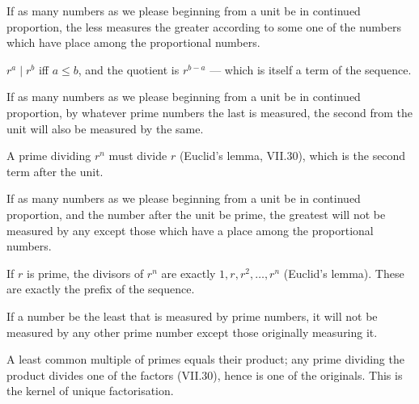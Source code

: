 \documentclass{rrxiv}
\begin{document}
\begin{claim}
\label{prop:IX.11}
If as many numbers as we please beginning from a unit be in continued
proportion, the less measures the greater according to some one of
the numbers which have place among the proportional numbers.
\end{claim}
\begin{evidence}[Proof of IX.11]
\label{ev:IX.11}
$r^a \mid r^b$ iff $a \le b$, and the quotient is $r^{b-a}$ --- which
is itself a term of the sequence.
\end{evidence}

\begin{claim}
\label{prop:IX.12}
If as many numbers as we please beginning from a unit be in continued
proportion, by whatever prime numbers the last is measured, the
second from the unit will also be measured by the same.
\end{claim}
\begin{evidence}[Proof of IX.12]
\label{ev:IX.12}
A prime dividing $r^n$ must divide $r$ (Euclid's lemma, VII.30),
which is the second term after the unit.
\end{evidence}

\begin{claim}
\label{prop:IX.13}
If as many numbers as we please beginning from a unit be in continued
proportion, and the number after the unit be prime, the greatest will
not be measured by any except those which have a place among the
proportional numbers.
\end{claim}
\begin{evidence}[Proof of IX.13]
\label{ev:IX.13}
If $r$ is prime, the divisors of $r^n$ are exactly $1, r, r^2, \dots,
r^n$ (Euclid's lemma).  These are exactly the prefix of the sequence.
\end{evidence}

\begin{claim}
\label{prop:IX.14}
If a number be the least that is measured by prime numbers, it will
not be measured by any other prime number except those originally
measuring it.
\end{claim}
\begin{evidence}[Proof of IX.14]
\label{ev:IX.14}
A least common multiple of primes equals their product; any prime
dividing the product divides one of the factors (VII.30), hence is
one of the originals.  This is the kernel of unique factorisation.
\end{evidence}
\end{document}
